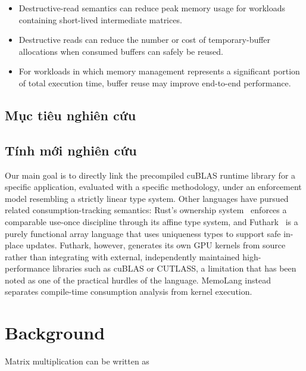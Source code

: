 \documentclass[a4paper]{article}
\begin{document}
	\begin{itemize}
	\item Destructive-read semantics can reduce peak memory usage for workloads containing short-lived intermediate matrices.
	\item Destructive reads can reduce the number or cost of temporary-buffer allocations when consumed buffers can safely be reused.
	\item For workloads in which memory management represents a significant portion of total execution time, buffer reuse may improve end-to-end performance.
	\end{itemize}
	
	\subsection{Mục tiêu nghiên cứu}
	
	
	\subsection{Tính mới nghiên cứu}
	
	Our main goal is to directly link the precompiled cuBLAS runtime library for a specific application, evaluated with a specific methodology, under an enforcement model resembling a strictly linear type system. Other languages have pursued related consumption-tracking semantics: Rust's ownership system~\cite{rust} enforces a comparable use-once discipline through its affine type system, and Futhark~\cite{futhark} is a purely functional array language that uses uniqueness types to support safe in-place updates. Futhark, however, generates its own GPU kernels from source rather than integrating with external, independently maintained high-performance libraries such as cuBLAS or CUTLASS, a limitation that has been noted as one of the practical hurdles of the language. MemoLang instead separates compile-time consumption analysis from kernel execution.
	
	\section{Background}
	
	
	Matrix multiplication can be written as
	
\end{document}
